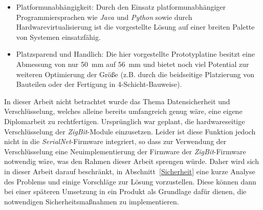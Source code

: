 \begin{itemize}
    \item{Platformunabhängigkeit:} Durch den Einsatz platformunabhängiger Programmiersprachen wie \emph{Java}
          und \emph{Python} sowie durch Hardwarevirtualisierung ist die vorgestellte Lösung auf
          einer breiten Palette von Systemen einsatzfähig.

    \item{Platzsparend und Handlich:} Die hier vorgestellte Prototyplatine besitzt eine Abmessung von nur
          50~mm auf 56~mm und bietet noch viel Potential zur weiteren Optimierung der Größe (z.B. durch
          die beidseitige Platzierung von Bauteilen oder der Fertigung in 4-Schicht-Bauweise).
\end{itemize}

In dieser Arbeit nicht betrachtet wurde das Thema Datensicherheit und Verschlüsselung, welches alleine bereits
umfangreich genug wäre, eine eigene Diplomarbeit zu rechtfertigen. Ursprünglich war geplant, die hardwareseitige
Verschlüsselung der \emph{ZigBit}-Module einzusetzen. Leider ist diese Funktion jedoch nicht in die 
\emph{SerialNet}-Firmware integriert, so dass zur Verwendung der Verschlüsselung eine Neuimplementierung der
Firmware der \emph{ZigBit}-Firmware notwendig wäre, was den Rahmen dieser Arbeit sprengen würde. Daher wird
sich in dieser Arbeit darauf beschränkt, in Abschnitt~\ref{Sicherheit} eine kurze Analyse des Problems und einige
Vorschläge zur Lösung vorzustellen. Diese können dann bei einer späteren Umsetzung in ein Produkt als Grundlage
dafür dienen, die notwendigen Sicherheitsmaßnahmen zu implementieren.
